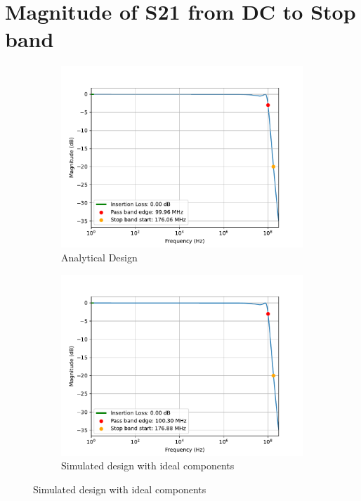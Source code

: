 \documentclass[letterpaper,12pt]{article}
\begin{document}
\section{Magnitude of S21 from DC to Stop band\label{sec:s21_dcstop}}
\begin{figure}[H]
    \begin{subfigure}[t]{.49\textwidth}
      \centering
      \includegraphics[width=\linewidth]{figures/6.analytical.pdf}
      \caption{Analytical Design}
    \end{subfigure}
    \hfill
    \begin{subfigure}[t]{.49\textwidth}
      \centering
      \includegraphics[width=\linewidth]{figures/6.ideal}
      \caption{Simulated design with ideal components}
    \end{subfigure}
  

\end{figure}
\end{document}
